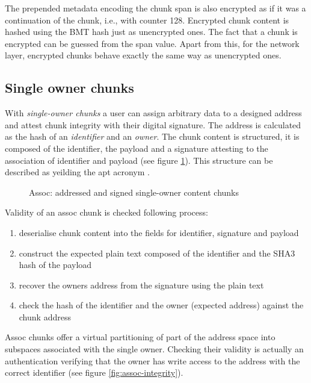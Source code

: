 The prepended metadata encoding the chunk span is also encrypted as if it was a continuation of the chunk, i.e., with counter 128. Encrypted chunk content is hashed using the BMT hash just as unencrypted ones. The fact that a chunk is encrypted can be guessed from the span value. Apart from this, for the network layer, encrypted chunks behave exactly the same way as unencrypted ones.

\subsection{Single owner chunks}\label{sec:single-owner-chunks}

With \emph{single-owner chunks} a user can assign arbitrary data to a designed address and attest chunk integrity with their digital signature. The address is calculated as the hash of an \emph{identifier} and an \emph{owner}. The chunk content is structured, it is composed of the identifier, the payload and a signature attesting to the association of identifier and payload (see figure \ref{fig:single-owner-chunks}). This structure can be described as  yeilding the apt acronym .



\begin{figure}[htbp]
   \centering
   \caption{Assoc: addressed and signed single-owner content chunks}
   \label{fig:single-owner-chunks}
\end{figure}

Validity of an assoc chunk is checked following process:

\begin{enumerate}
    \item deserialise chunk content into the fields for identifier, signature and payload
    \item construct the expected plain text composed of the identifier and the SHA3 hash of the payload
    \item recover the owners address from the signature using the plain text
    \item check the hash of the identifier and the owner (expected address) against the chunk address
\end{enumerate}

Assoc chunks offer a virtual partitioning of part of the address space into subspaces associated with the single owner. Checking their validity is actually an authentication verifying that the owner has write access to the address with the correct identifier (see figure \ref{fig:assoc-integrity}). 

